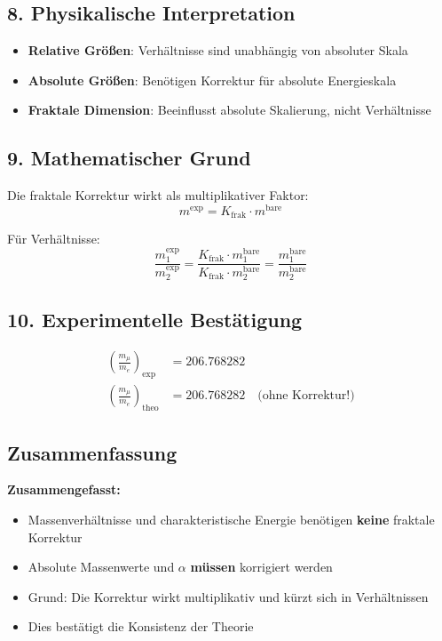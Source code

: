 \documentclass[12pt,a4paper]{article}
\begin{document}
\subsection{8. Physikalische Interpretation}

\begin{itemize}
	\item \textbf{Relative Größen}: Verhältnisse sind unabhängig von absoluter Skala
	\item \textbf{Absolute Größen}: Benötigen Korrektur für absolute Energieskala
	\item \textbf{Fraktale Dimension}: Beeinflusst absolute Skalierung, nicht Verhältnisse
\end{itemize}

\subsection{9. Mathematischer Grund}

Die fraktale Korrektur wirkt als multiplikativer Faktor:
\[
m^{\text{exp}} = K_{\text{frak}} \cdot m^{\text{bare}}
\]

Für Verhältnisse:
\[
\frac{m_1^{\text{exp}}}{m_2^{\text{exp}}} = \frac{K_{\text{frak}} \cdot m_1^{\text{bare}}}{K_{\text{frak}} \cdot m_2^{\text{bare}}} = \frac{m_1^{\text{bare}}}{m_2^{\text{bare}}}
\]

\subsection{10. Experimentelle Bestätigung}

\begin{align*}
	\left(\frac{m_\mu}{m_e}\right)_{\text{exp}} &= 206.768282 \\
	\left(\frac{m_\mu}{m_e}\right)_{\text{theo}} &= 206.768282 \quad \text{(ohne Korrektur!)}
\end{align*}

\subsection{Zusammenfassung}

\begin{tcolorbox}[colback=blue!5!white,colframe=blue!75!black]
	\textbf{Zusammengefasst:}
	\begin{itemize}
		\item Massenverhältnisse und charakteristische Energie benötigen \textbf{keine} fraktale Korrektur
		\item Absolute Massenwerte und $\alpha$ \textbf{müssen} korrigiert werden
		\item Grund: Die Korrektur wirkt multiplikativ und kürzt sich in Verhältnissen
		\item Dies bestätigt die Konsistenz der Theorie
	\end{itemize}
\end{tcolorbox}
\end{document}
